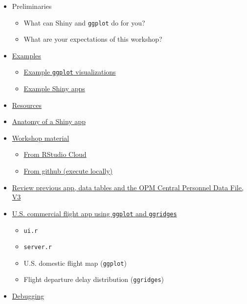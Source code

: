 \documentclass[10pt, letterpaper]{article}
\begin{document}
\begin{spacing}{1.0}
\begin{itemize}
    \item Preliminaries
      \begin{itemize}[noitemsep]
        \item What can Shiny and \texttt{ggplot} do for you?
        \item What are your expectations of this workshop?
      \end{itemize}
    \item \hyperref[sec:examples]{Examples}
      \begin{itemize}[noitemsep]
        \item \hyperref[sec:examplevis]{Example \texttt{ggplot} visualizations}
        \item \hyperref[sec:exampleapps]{Example Shiny apps}
      \end{itemize}
    \item \hyperref[sec:resources]{Resources}
    \item \hyperref[sec:anatomyofapp]{Anatomy of a Shiny app}
    \item \hyperref[sec:accesworkshopmaterial]{Workshop material}
      \begin{itemize}[noitemsep]
        \item \hyperref[sec:materialcloud]{From RStudio Cloud}
        \item \hyperref[sec:materialgit]{From github (execute locally)}
      \end{itemize}
    \item \hyperref[sec:reviewapp]{Review previous app, data tables and the OPM Central Personnel Data File, V3}
    \item \hyperref[sec:flightapp]{U.S. commercial flight app using \texttt{ggplot} and \texttt{ggridges}}
      \begin{itemize}[noitemsep]
        \item \texttt{ui.r}
        \item \texttt{server.r}
        \item U.S. domestic flight map (\texttt{ggplot})
        \item Flight departure delay distribution (\texttt{ggridges})
      \end{itemize}
    \item \hyperref[sec:debugging]{Debugging}
\end{itemize}




\end{spacing}
\end{document}
